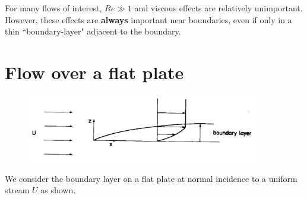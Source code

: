 \documentclass[10pt]{report}
\begin{document}
For many flows of interest, $Re \gg 1$ and viscous effects are relatively
unimportant. However, these effects are \textbf{always} important near
boundaries, even if only in a thin ``boundary-layer" adjacent to the
boundary.

\section{Flow over a flat plate}
\begin{figure}[htbp]
\centerline{\includegraphics[width=4in]{Section61.pdf}}
\caption{ }
\label{fig3.1}
\end{figure}

We consider the boundary layer on a flat plate at normal incidence to a
uniform stream $U$ as shown.
\end{document}
